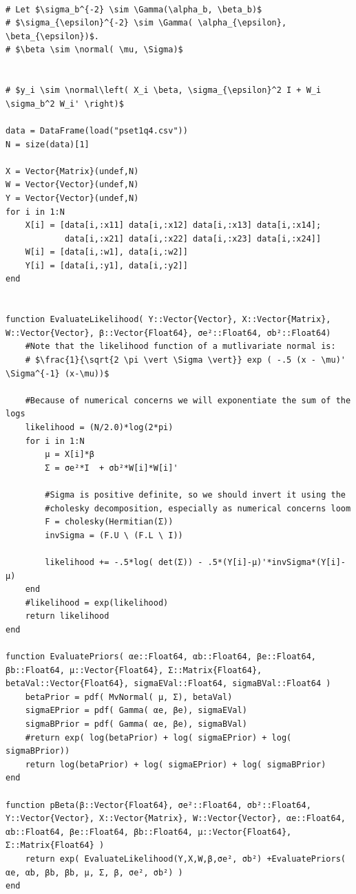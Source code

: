 \documentclass[12pt]{paper}
\newcommand{\normal}{\mathcal{N}}
\begin{document}
\begin{verbatim}

# Let $\sigma_b^{-2} \sim \Gamma(\alpha_b, \beta_b)$
# $\sigma_{\epsilon}^{-2} \sim \Gamma( \alpha_{\epsilon}, \beta_{\epsilon})$.
# $\beta \sim \normal( \mu, \Sigma)$


# $y_i \sim \normal\left( X_i \beta, \sigma_{\epsilon}^2 I + W_i \sigma_b^2 W_i' \right)$

data = DataFrame(load("pset1q4.csv"))
N = size(data)[1]

X = Vector{Matrix}(undef,N)
W = Vector{Vector}(undef,N)
Y = Vector{Vector}(undef,N)
for i in 1:N
    X[i] = [data[i,:x11] data[i,:x12] data[i,:x13] data[i,:x14];
            data[i,:x21] data[i,:x22] data[i,:x23] data[i,:x24]]
    W[i] = [data[i,:w1], data[i,:w2]]
    Y[i] = [data[i,:y1], data[i,:y2]]
end


function EvaluateLikelihood( Y::Vector{Vector}, X::Vector{Matrix}, W::Vector{Vector}, β::Vector{Float64}, σe²::Float64, σb²::Float64)
    #Note that the likelihood function of a mutlivariate normal is:
    # $\frac{1}{\sqrt{2 \pi \vert \Sigma \vert}} exp ( -.5 (x - \mu)' \Sigma^{-1} (x-\mu))$

    #Because of numerical concerns we will exponentiate the sum of the logs
    likelihood = (N/2.0)*log(2*pi)
    for i in 1:N
        μ = X[i]*β
        Σ = σe²*I  + σb²*W[i]*W[i]'

        #Sigma is positive definite, so we should invert it using the
        #cholesky decomposition, especially as numerical concerns loom
        F = cholesky(Hermitian(Σ))
        invSigma = (F.U \ (F.L \ I))

        likelihood += -.5*log( det(Σ)) - .5*(Y[i]-μ)'*invSigma*(Y[i]-μ)
    end
    #likelihood = exp(likelihood)
    return likelihood
end

function EvaluatePriors( αe::Float64, αb::Float64, βe::Float64, βb::Float64, μ::Vector{Float64}, Σ::Matrix{Float64}, betaVal::Vector{Float64}, sigmaEVal::Float64, sigmaBVal::Float64 )
    betaPrior = pdf( MvNormal( μ, Σ), betaVal)
    sigmaEPrior = pdf( Gamma( αe, βe), sigmaEVal)
    sigmaBPrior = pdf( Gamma( αe, βe), sigmaBVal)
    #return exp( log(betaPrior) + log( sigmaEPrior) + log( sigmaBPrior))
    return log(betaPrior) + log( sigmaEPrior) + log( sigmaBPrior)
end

function pBeta(β::Vector{Float64}, σe²::Float64, σb²::Float64, Y::Vector{Vector}, X::Vector{Matrix}, W::Vector{Vector}, αe::Float64, αb::Float64, βe::Float64, βb::Float64, μ::Vector{Float64}, Σ::Matrix{Float64} )
    return exp( EvaluateLikelihood(Y,X,W,β,σe², σb²) +EvaluatePriors( αe, αb, βb, βb, μ, Σ, β, σe², σb²) )
end


\end{verbatim}
\end{document}
